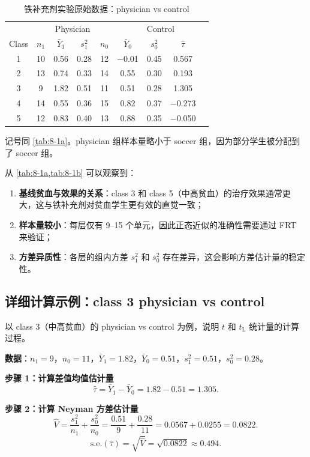 \begin{table}[htbp]
\caption{铁补充剂实验原始数据：physician vs control}
\label{tab:8-1b}
\centering
\begin{tabular}{c|cccc|cccc}
\toprule
 & \multicolumn{4}{c}{Physician} & \multicolumn{4}{c}{Control} \\
Class & $n_1$ & $\bar{Y}_1$ & $s_1^2$ & $n_0$ & $\bar{Y}_0$ & $s_0^2$ & $\hat\tau$ \\ \midrule
1 & 10 & 0.56 & 0.28 & 12 & $-$0.01 & 0.45 & 0.567 \\
2 & 13 & 0.74 & 0.33 & 14 & 0.55 & 0.30 & 0.193 \\
3 & 9  & 1.82 & 0.51 & 11 & 0.51 & 0.28 & 1.305 \\
4 & 14 & 0.55 & 0.36 & 15 & 0.82 & 0.37 & $-$0.273 \\
5 & 12 & 0.83 & 0.40 & 13 & 0.88 & 0.35 & $-$0.050 \\ \bottomrule
\end{tabular}
\par\medskip\small
记号同 \cref{tab:8-1a}。physician 组样本量略小于 soccer 组，因为部分学生被分配到了 soccer 组。
\end{table}

从 \cref{tab:8-1a,tab:8-1b} 可以观察到：
\begin{enumerate}
  \item \textbf{基线贫血与效果的关系}：class 3 和 class 5（中高贫血）的治疗效果通常更大，这与铁补充剂对贫血学生更有效的直觉一致；
  \item \textbf{样本量较小}：每层仅有 9--15 个单元，因此正态近似的准确性需要通过 FRT 来验证；
  \item \textbf{方差异质性}：各层的组内方差 $s_1^2$ 和 $s_0^2$ 存在差异，这会影响方差估计量的稳定性。
\end{enumerate}

\subsection{详细计算示例：class 3 physician vs control}\label{sec:8-calc-class3}

以 class 3（中高贫血）的 physician vs control 为例，说明 $t$ 和 $t_\mathrm{L}$ 统计量的计算过程。

\textbf{数据}：$n_1 = 9$，$n_0 = 11$，$\bar{Y}_1 = 1.82$，$\bar{Y}_0 = 0.51$，$s_1^2 = 0.51$，$s_0^2 = 0.28$。

\textbf{步骤 1：计算差值均值估计量}
\[
\hat\tau = \bar{Y}_1 - \bar{Y}_0 = 1.82 - 0.51 = 1.305.
\]

\textbf{步骤 2：计算 Neyman 方差估计量}
\[
\hat V = \frac{s_1^2}{n_1} + \frac{s_0^2}{n_0} = \frac{0.51}{9} + \frac{0.28}{11} = 0.0567 + 0.0255 = 0.0822.
\]
\[
\text{s.e.}(\hat\tau) = \sqrt{\hat V} = \sqrt{0.0822} \approx 0.494.
\]

